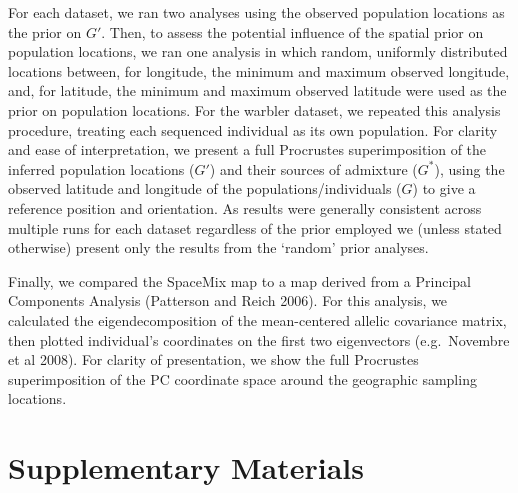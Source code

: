 \documentclass[12pt]{article}
\newcommand{\identifyadmixsource}[1]{{#1^{*}}}
\begin{document}
For each dataset, we ran two analyses using the observed population locations as the prior on $G'$.  Then, to assess the potential influence of the spatial prior on population locations, we ran one analysis in which random, uniformly distributed locations between, for longitude, the minimum and maximum observed longitude, and, for latitude, the minimum and maximum observed latitude were used as the prior on population locations.  For the warbler dataset, we repeated this analysis procedure, treating each sequenced individual as its own population.  For clarity and ease of interpretation, we present a full Procrustes superimposition of the inferred population locations ($G'$) and their sources of admixture ($\identifyadmixsource{G}$), using the observed latitude and longitude of the populations/individuals ($G$) to give a reference position and orientation.  As results were generally consistent across multiple runs for each dataset regardless of the prior employed we (unless stated otherwise) present only the results from the `random' prior analyses.

Finally, we compared the SpaceMix map to a map derived from a Principal Components Analysis (Patterson and Reich 2006).  For this analysis, we calculated the eigendecomposition of the mean-centered allelic covariance matrix, then plotted individual's coordinates on the first two eigenvectors (e.g.\ Novembre et al 2008).  For clarity of presentation, we show the full Procrustes superimposition of the PC coordinate space around the geographic sampling locations.

\newpage



\newpage


\section*{Supplementary Materials}
\end{document}
